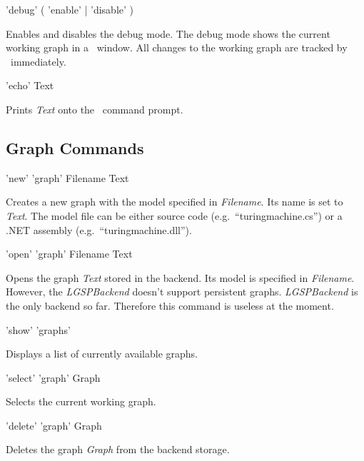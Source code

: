 \begin{rail}
  'debug' ( 'enable' | 'disable' )
\end{rail} 
Enables and disables the debug mode. The debug mode shows the current working graph in a \yComp\ window. All changes to the working graph are tracked by \yComp\ immediately.  

\begin{rail}
  'echo' Text
\end{rail}
Prints \emph{Text} onto the \GrShell\ command prompt.

\subsection{Graph Commands}
\label{graphcommands}

\begin{rail}
  'new' 'graph' Filename Text 
\end{rail}
Creates a new graph with the model specified in \emph{Filename}. Its name is set to \emph{Text}. The model file can be either source code (e.g.\ ``turing\textunderscore machine.cs'') or a .NET assembly (e.g.\ ``turing\textunderscore machine.dll'').

\begin{rail}
  'open' 'graph' Filename Text
\end{rail}
Opens the graph \emph{Text} stored in the backend. Its model is specified in \emph{File\-name}. However, the \emph{LGSPBackend} doesn't support persistent graphs. \emph{LGSPBackend} is the only backend so far. Therefore this command is useless at the moment.

\begin{rail}
  'show' 'graphs'
\end{rail}
Displays a list of currently available graphs.

\begin{rail}
  'select' 'graph' Graph
\end{rail}
Selects the current working graph.

\begin{rail}
  'delete' 'graph' Graph
\end{rail}
Deletes the graph \emph{Graph} from the backend storage.

